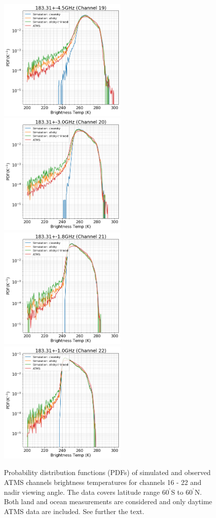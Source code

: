\documentclass[12pt]{article}
\newcommand{\degree}{\ensuremath{\mathrm{^\circ}}}
\begin{document}
\begin{figure}[p]
	\includegraphics[height=60mm]{ATMS_C19_distribution}
	\includegraphics[height=60mm]{ATMS_C20_distribution}\hspace{5mm}%
	\includegraphics[height=60mm]{ATMS_C21_distribution}
	\includegraphics[height=60mm]{ATMS_C22_distribution}
	\caption{Probability distribution functions (PDFs) of simulated and
      observed ATMS channels brightness temperatures for channels 16 - 22 and
      nadir viewing angle. The data covers latitude range $60^{\degree}$S to
      $60^{\degree}$N. Both land and ocean measurements are considered and only
      daytime ATMS data are included. See further the text.}
	\label{fig:pdf:c16-22}
\end{figure}
\end{document}
